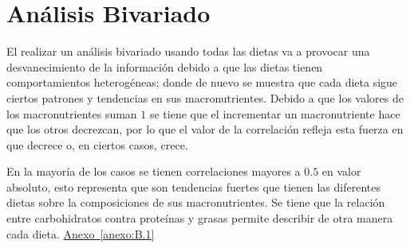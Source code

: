 \documentclass[12pt,a4paper]{article}
\newcommand{\anexoref}[1]{%
    \hyperref[#1]{Anexo~\ref*{#1} \nameref*{#1}}%
}
\begin{document}
    \section{Análisis Bivariado}\label{sec:biva}
    {
        El realizar un análisis bivariado usando todas las dietas va a 
        provocar una desvanecimiento de la información debido a que las dietas 
        tienen comportamientos heterogéneas; 
        donde de nuevo se muestra que cada dieta sigue ciertos patrones 
        y tendencias en sus macronutrientes. Debido a que los valores 
        de los macronutrientes suman $1$ se tiene que el incrementar 
        un macronutriente hace que los otros decrezcan, por lo que el 
        valor de la correlación refleja esta fuerza en que decrece o, 
        en ciertos casos, crece.\newline 
        
        En la mayoría de los casos se tienen 
        correlaciones mayores a $0.5$ en valor absoluto, esto representa 
        que son tendencias fuertes que tienen las diferentes dietas sobre 
        la composiciones de sus macronutrientes. Se tiene que la relación 
        entre carbohidratos contra proteínas y grasas permite describir de 
        otra manera cada dieta. \anexoref{anexo:B.1}

}
\end{document}
